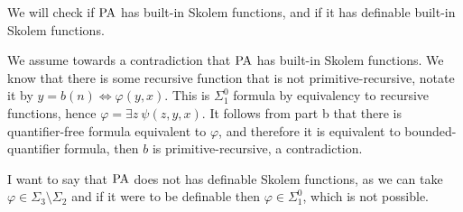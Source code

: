 \subquestion{}
We will check if $\operatorname{PA}$ has built-in Skolem functions, and if it has definable built-in Skolem functions.
\begin{solution}
	We assume towards a contradiction that $\operatorname{PA}$ has built-in Skolem functions.
	We know that there is some recursive function that is not primitive-recursive, notate it by $y = b(n) \iff \varphi(y, x)$.
	This is $\Sigma_1^0$ formula by equivalency to recursive functions, hence $\varphi = \exists z\ \psi(z, y, x)$.
	It follows from part b that there is quantifier-free formula equivalent to $\varphi$, and therefore it is equivalent to bounded-quantifier formula, then $b$ is primitive-recursive, a contradiction.

	I want to say that $\operatorname{PA}$ does not has definable Skolem functions, as we can take $\varphi \in \Sigma_3 \setminus \Sigma_2$ and if it were to be definable then $\varphi \in \Sigma_1^0$, which is not possible.
\end{solution}

